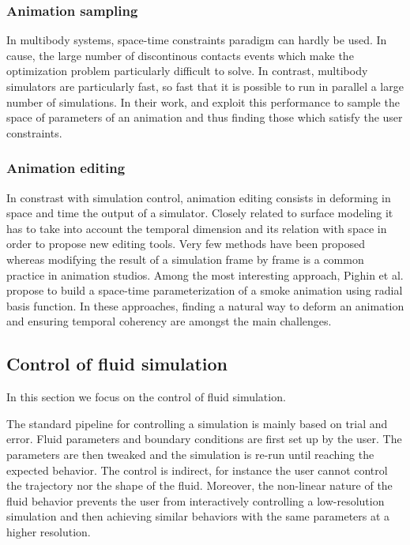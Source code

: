 \subsubsection{Animation sampling}
In multibody systems, space-time constraints paradigm can hardly be used. In cause, the large number of discontinous contacts events which make the optimization problem particularly difficult to solve. In contrast, multibody simulators are particularly fast, so fast that it is possible to run in parallel a large number of simulations. In their work, \cite{Chenney2000} and \cite{Twigg2007} exploit this performance to sample the space of parameters of an animation and thus finding those which satisfy the user constraints.

\subsubsection{Animation editing} 
In constrast with simulation control, animation editing consists in deforming in space and time the output of a simulator. Closely related to surface modeling it has to take into account the temporal dimension and its relation with space in order to propose new editing tools. Very few methods have been proposed whereas modifying the result of a simulation frame by frame is a common practice in animation studios. Among the most interesting approach, Pighin et al.\cite{Pighin2004} propose to build a space-time parameterization of a smoke animation using radial basis function. In these approaches, finding a natural way to deform an animation and ensuring temporal coherency are amongst the main challenges.

\subsection{Control of fluid simulation}
\label{subsec:fluidControl}
In this section we focus on the control of fluid simulation.

The standard pipeline for controlling a simulation is mainly based on trial and error. Fluid parameters and boundary conditions are first set up by the user. The parameters are then tweaked and the simulation is re-run until reaching the expected behavior. The control is indirect, for instance the user cannot control the trajectory nor the shape of the fluid. Moreover, the non-linear nature of the fluid behavior prevents the user from interactively controlling a low-resolution simulation and then achieving similar behaviors with the same parameters at a higher resolution.

